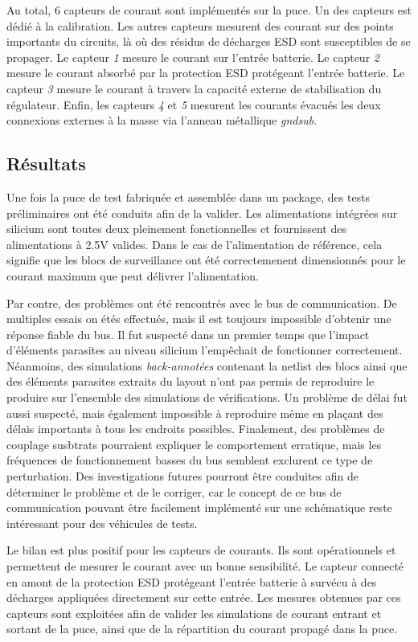 Au total, 6 capteurs de courant sont implémentés sur la puce.
Un des capteurs est dédié à la calibration.
Les autres capteurs mesurent des courant sur des points importants du circuits, là où des résidus de décharges ESD sont susceptibles de se propager.
Le capteur \textit{1} mesure le courant sur l'entrée batterie.
Le capteur \textit{2} mesure le courant absorbé par la protection ESD protégeant l'entrée batterie.
Le capteur \textit{3} mesure le courant à travers la capacité externe de stabilisation du régulateur.
Enfin, les capteurs \textit{4} et \textit{5} mesurent les courants évacués les deux connexions externes à la masse via l'anneau métallique \textit{gndsub}.

\subsection{Résultats}

Une fois la puce de test fabriquée et assemblée dans un package, des tests préliminaires ont été conduits afin de la valider.
Les alimentations intégrées sur silicium sont toutes deux pleinement fonctionnelles et fournissent des alimentations à 2.5V valides.
Dans le cas de l'alimentation de référence, cela signifie que les blocs de surveillance ont été correctemenent dimensionnés pour le courant maximum que peut délivrer l'alimentation.

Par contre, des problèmes ont été rencontrés avec le bus de communication.
De multiples essais on étés effectués, mais il est toujours impossible d'obtenir une réponse fiable du bus.
Il fut suspecté dans un premier temps que l'impact d'éléments parasites au niveau silicium l'empêchait de fonctionner correctement.
Néanmoins, des simulations \textit{back-annotées} contenant la netlist des blocs ainsi que des éléments parasites extraits du layout n'ont pas permis de reproduire le produire sur l'ensemble des simulations de vérifications.
Un problème de délai fut aussi suspecté, mais également impossible à reproduire même en plaçant des délais importants à tous les endroits possibles.
Finalement, des problèmes de couplage susbtrats pourraient expliquer le comportement erratique, mais les fréquences de fonctionnement basses du bus semblent exclurent ce type de perturbation.
Des investigations futures pourront être conduites afin de déterminer le problème et de le corriger, car le concept de ce bus de communication pouvant être facilement implémenté sur une schématique reste intéressant pour des véhicules de tests.

Le bilan est plus positif pour les capteurs de courants.
Ils sont opérationnels et permettent de mesurer le courant avec un bonne sensibilité.
Le capteur connecté en amont de la protection ESD protégeant l'entrée batterie à survécu à des décharges appliquées directement sur cette entrée.
Les mesures obtenues par ces capteurs sont exploitées afin de valider les simulations de courant entrant et sortant de la puce, ainsi que de la répartition du courant propagé dans la puce.
